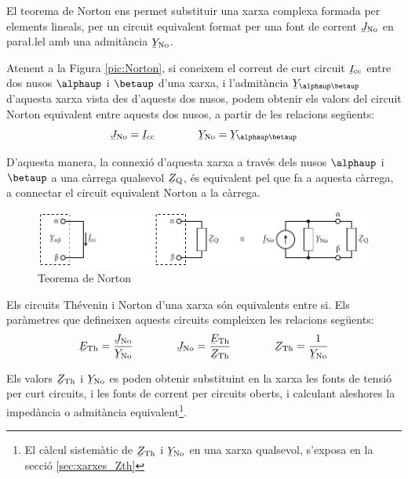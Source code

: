 El teorema de Norton ens permet substituir
una xarxa complexa formada per elements lineals, per un circuit
equivalent format per una font de corrent $\cmplx{J}\ped{No}$ en
para{\l.l}el amb una admit\`{a}ncia $\cmplx{Y}\ped{No}$.

Atenent a la Figura \vref{pic:Norton}, si coneixem el corrent de
curt circuit $\cmplx{I}\ped{cc}$ entre dos nusos $\alphaup$ i $\betaup$
d'una xarxa, i l'admit\`{a}ncia $\cmplx{Y}_{\alphaup\betaup}$ d'aquesta
xarxa vista des d'aquests dos nusos, podem obtenir els valors del
circuit Norton equivalent entre aquests dos nusos, a partir de les
relacions seg\"{u}ents:
\begin{equation}
   \cmplx{J}\ped{No} = \cmplx{I}\ped{cc} \qquad\qquad \cmplx{Y}\ped{No} = \cmplx{Y}_{\alphaup\betaup}
\end{equation}

D'aquesta manera, la connexi\'{o} d'aquesta xarxa a trav\'{e}s dels nusos
$\alphaup$ i $\betaup$ a una c\`{a}rrega qualsevol $\cmplx{Z}\ped{Q}$, \'{e}s
equivalent pel que fa a aquesta c\`{a}rrega, a connectar el circuit
equivalent Norton a la c\`{a}rrega.
\begin{figure}[h]
\centering
    \includegraphics{Imatges/Cap-Fonaments-Norton.pdf}
\caption{Teorema de Norton} \label{pic:Norton}
\end{figure}

Els circuits Th\'{e}venin i Norton d'una xarxa s\'{o}n equivalents entre si.
Els par\`{a}metres que defineixen aquests circuits compleixen les relacions
seg\"{u}ents:
\begin{equation}\label{eq:Thevenin-Norton}
   \cmplx{E}\ped{Th} = \frac{\cmplx{J}\ped{No}}{\cmplx{Y}\ped{No}} \qquad\qquad
   \cmplx{J}\ped{No} = \frac{\cmplx{E}\ped{Th}}{\cmplx{Z}\ped{Th}} \qquad\qquad
    \cmplx{Z}\ped{Th} = \frac{1}{\cmplx{Y}\ped{No}}
\end{equation}

Els valors $\cmplx{Z}\ped{Th}$ i  $\cmplx{Y}\ped{No}$ es poden
obtenir substituint en la xarxa  les fonts de tensi\'{o}  per curt
circuits, i les fonts de corrent per circuits oberts, i calculant
aleshores la imped\`{a}ncia o admit\`{a}ncia equivalent\footnote{El c\`{a}lcul sistem\`{a}tic de $\cmplx{Z}\ped{Th}$ i  $\cmplx{Y}\ped{No}$ en una xarxa qualsevol, s'exposa en la secci\'{o} \ref{sec:xarxes_Zth}}.

